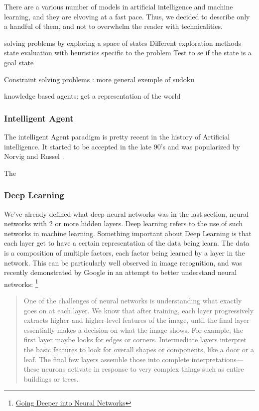 \documentclass[12pt]{article}
\begin{document}
There are a various number of models in artificial intelligence and machine learning,
and they are elvoving at a fast pace. Thus, we decided to describe only a handful
of them, and not to overwhelm the reader with technicalities.

solving problems by exploring a space of states
Different exploration methods
state evaluation with heuristics specific to the problem
Test to se if the state is a goal state




Constraint solving problems : more general
exemple of sudoku

knowledge based agents: get a representation of the world

\subsubsection{Intelligent Agent}

The intelligent Agent paradigm is pretty recent in the history of Artificial
intelligence. It started to be accepted in the late 90's and was popularized by
Norvig and Russel \cite{RusselAI}.

The

\subsubsection{Deep Learning}

We've already defined what deep neural networks was in the last section, neural
networks with 2 or more hidden layers. Deep learning refers to the use of such
networks in machine learning. Something important about Deep Learning is that
each layer get to have a certain representation of the data being learn. The
data is a composition of multiple factors, each factor being learned by a layer
in the  network. This can be particularly well observed in image recognition,
and was  recently demonstrated by Google in an attempt to better understand
neural networks:
\footnote{\href{http://googleresearch.blogspot.co.uk/2015/06/inceptionism-going-deeper-into-neural.html}
{Going Deeper into Neural Networks}}

\begin{quote}
  One of the challenges of neural networks is understanding what exactly goes on
  at each layer. We know that after training, each layer progressively extracts
  higher and higher-level features of the image, until the final layer
  essentially makes a decision on what the image shows. For example, the first
  layer maybe looks for edges or corners. Intermediate layers interpret the
  basic features to look for overall shapes or components, like a door or a
  leaf. The final few layers assemble those into complete interpretations—these
  neurons activate in response to very complex things such as entire buildings
  or trees.
\end{quote}
\end{document}
